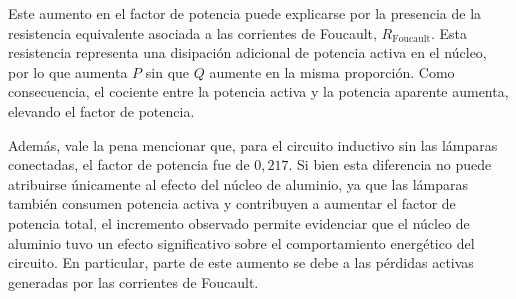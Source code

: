 Este aumento en el factor de potencia puede explicarse por la presencia de la resistencia equivalente asociada a las corrientes de Foucault, \(R_{\text{Foucault}}\). Esta resistencia representa una disipación adicional de potencia activa en el núcleo, por lo que aumenta \(P\) sin que \(Q\) aumente en la misma proporción. Como consecuencia, el cociente entre la potencia activa y la potencia aparente aumenta, elevando el factor de potencia.

Además, vale la pena mencionar que, para el circuito inductivo sin las lámparas conectadas, el factor de potencia fue de \(0{,}217\). Si bien esta diferencia no puede atribuirse únicamente al efecto del núcleo de aluminio, ya que las lámparas también consumen potencia activa y contribuyen a aumentar el factor de potencia total, el incremento observado permite evidenciar que el núcleo de aluminio tuvo un efecto significativo sobre el comportamiento energético del circuito. En particular, parte de este aumento se debe a las pérdidas activas generadas por las corrientes de Foucault.

